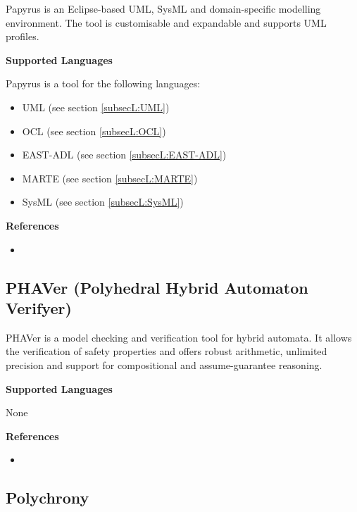 Papyrus is an Eclipse-based UML, SysML and domain-specific modelling environment. The tool is customisable and expandable and supports UML profiles.

\textbf{Supported Languages}

Papyrus is a tool for the following languages:
\begin{itemize}
	\item UML (see section \ref{subsecL:UML})
	\item OCL (see section \ref{subsecL:OCL})
	\item EAST-ADL (see section \ref{subsecL:EAST-ADL})
	\item MARTE (see section \ref{subsecL:MARTE})
	\item SysML (see section \ref{subsecL:SysML})
\end{itemize}


\textbf{References}
\begin{itemize}
	
\item {}
\end{itemize}



\subsection{PHAVer (Polyhedral Hybrid Automaton Verifyer)}
\label{subsecT:PHAVer}


PHAVer is a model checking and verification tool for hybrid automata. It allows the verification of safety properties and offers robust arithmetic, unlimited precision and support for compositional and assume-guarantee reasoning.

\textbf{Supported Languages}

None


\textbf{References}
\begin{itemize}
	
\item {}
\end{itemize}



\subsection{Polychrony}
\label{subsecT:Polychrony}


